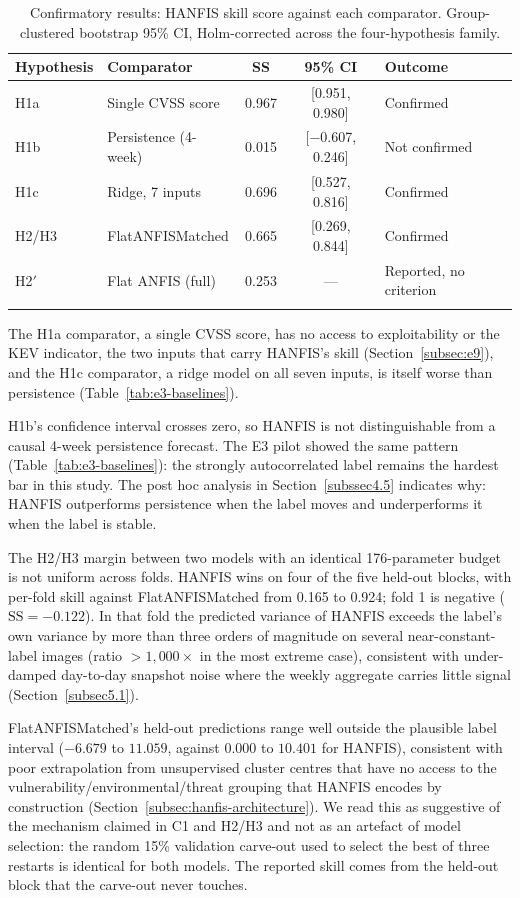 \documentclass[referee,lineno,pdflatex,sn-basic]{sn-jnl}%
\theoremstyle{thmstyleone}%
\theoremstyle{thmstyletwo}%
\theoremstyle{thmstylethree}%
\begin{document}
\begin{table}[h]
\caption{Confirmatory results: HANFIS skill score against each comparator. Group-clustered bootstrap 95\% CI, Holm-corrected across the four-hypothesis family.}\label{tab:e4-results}
\begin{tabular}{@{}llccl@{}}
\toprule
Hypothesis & Comparator & SS & 95\% CI & Outcome \\
\midrule
H1a & Single CVSS score & 0.967 & [0.951, 0.980] & Confirmed \\
H1b & Persistence (4-week) & 0.015 & [$-$0.607, 0.246] & Not confirmed \\
H1c & Ridge, 7 inputs & 0.696 & [0.527, 0.816] & Confirmed \\
H2/H3 & FlatANFISMatched & 0.665 & [0.269, 0.844] & Confirmed \\
H2$'$ & Flat ANFIS (full) & 0.253 & --- & Reported, no criterion \\
\botrule
\end{tabular}
\end{table}

The H1a comparator, a single CVSS score, has no access to exploitability or the KEV indicator, the two inputs that carry HANFIS's skill (Section~\ref{subsec:e9}), and the H1c comparator, a ridge model on all seven inputs, is itself worse than persistence (Table~\ref{tab:e3-baselines}).

H1b's confidence interval crosses zero, so HANFIS is not distinguishable from a causal 4-week persistence forecast. The E3 pilot showed the same pattern (Table~\ref{tab:e3-baselines}): the strongly autocorrelated label remains the hardest bar in this study. The post hoc analysis in Section~\ref{subssec4.5} indicates why: HANFIS outperforms persistence when the label moves and underperforms it when the label is stable.

The H2/H3 margin between two models with an identical 176-parameter budget is not uniform across folds. HANFIS wins on four of the five held-out blocks, with per-fold skill against FlatANFISMatched from 0.165 to 0.924; fold 1 is negative ($\mathrm{SS}=-0.122$). In that fold the predicted variance of HANFIS exceeds the label's own variance by more than three orders of magnitude on several near-constant-label images (ratio $>1{,}000\times$ in the most extreme case), consistent with under-damped day-to-day snapshot noise where the weekly aggregate carries little signal (Section~\ref{subsec5.1}).

FlatANFISMatched's held-out predictions range well outside the plausible label interval ($-6.679$ to $11.059$, against $0.000$ to $10.401$ for HANFIS), consistent with poor extrapolation from unsupervised cluster centres that have no access to the vulnerability/environmental/threat grouping that HANFIS encodes by construction (Section~\ref{subsec:hanfis-architecture}). We read this as suggestive of the mechanism claimed in C1 and H2/H3 and not as an artefact of model selection: the random 15\% validation carve-out used to select the best of three restarts is identical for both models. The reported skill comes from the held-out block that the carve-out never touches.
\end{document}

